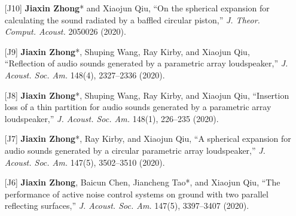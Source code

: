 \documentclass[10pt,a4paper,ragged2e,withhyper]{altacv}
\newcommand{\PubJournal}[1]{\textit{#1}}
\newcommand{\PubTitle}[1]{``{#1,}''}
\newcommand{\PubCorAuthor}[1]{#1*}
\newcommand{\PubMe}[1]{\textbf{#1}}
\begin{document}
\begin{itemize}[leftmargin = 30pt]
    \item[{[J10]}]
        \PubCorAuthor{\PubMe{Jiaxin Zhong}} and Xiaojun Qiu,
        \PubTitle{On the spherical expansion for calculating the sound radiated by a baffled circular piston} 
        \PubJournal{J. Theor. Comput. Acoust.}
        2050026 (2020).
        \href{https://doi.org/10.1142/S2591728520500267}{\color{accent}\aiDoi}
        \href{https://github.com/JiaxinZhong/JiaxinZhong.github.io/raw/master/publications/journal/Zhong2020-JTCA-Piston_radiation.pdf}{\color{accent}\faFilePdf[regular]}

    \item[{[J9]}]
        \PubCorAuthor{\textbf{Jiaxin Zhong}}, Shuping Wang, Ray Kirby, and Xiaojun Qiu, 
        \PubTitle{Reflection of audio sounds generated by a parametric array loudspeaker} 
        \PubJournal{J. Acoust. Soc. Am.}
        148(4), 2327--2336 (2020).
        \href{https://doi.org/10.1121/10.0002161}{\color{accent}\aiDoi}
        \href{https://github.com/JiaxinZhong/JiaxinZhong.github.io/raw/master/publications/journal/Zhong2020-JASA-PAL_reflection.pdf}{\color{accent}\faFilePdf[regular]}

    \item[{[J8]}]
        \PubCorAuthor{\textbf{Jiaxin Zhong}}, Shuping Wang, Ray Kirby, and Xiaojun Qiu, 
        \PubTitle{Insertion loss of a thin partition for audio sounds generated by a parametric array loudspeaker}
        \PubJournal{J. Acoust. Soc. Am.}
        148(1), 226--235 (2020).
        \href{https://doi.org/10.1121/10.0001568}{\color{accent}\aiDoi}
        \href{https://github.com/JiaxinZhong/JiaxinZhong.github.io/raw/master/publications/journal/Zhong2020-JASA-PAL_insertion_loss.pdf}{\color{accent}\faFilePdf[regular]}

    \item[{[J7]}]
        \PubCorAuthor{\textbf{Jiaxin Zhong}}, Ray Kirby, and Xiaojun Qiu, 
        \PubTitle{A spherical expansion for audio sounds generated by a circular parametric array loudspeaker}
        \PubJournal{J. Acoust. Soc. Am.}
        147(5), 3502--3510 (2020).
        \href{https://doi.org/10.1121/10.0001261}{\color{accent}\aiDoi}
        \href{https://github.com/JiaxinZhong/JiaxinZhong.github.io/raw/master/publications/journal/Zhong2020-JASA-PAL_SWE.pdf}{\color{accent}\faFilePdf[regular]}

    \item[{[J6]}] \textbf{Jiaxin Zhong}, Baicun Chen, \PubCorAuthor{Jiancheng Tao}, and Xiaojun Qiu,
        \PubTitle{The performance of active noise control systems on ground with two parallel reflecting surfaces}
        \PubJournal{J. Acoust. Soc. Am.}
        147(5), 3397--3407 (2020).
        \href{https://doi.org/10.1121/10.0001227}{\color{accent}\aiDoi}
        \href{https://github.com/JiaxinZhong/JiaxinZhong.github.io/raw/master/publications/journal/Zhong2020-JASA-ANC_parallel_surface.pdf}{\color{accent}\faFilePdf[regular]}


\end{itemize}
\end{document}
